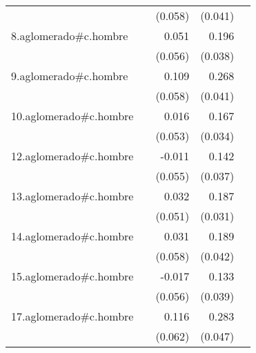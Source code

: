 {\begin{longtable}{l*{4}{D{.}{.}{-1}}}
            &                     &     (0.058)         &     (0.041)         &                     \\
\addlinespace
8.aglomerado#c.hombre&                     &       0.051         &       0.196\sym{***}&                     \\
            &                     &     (0.056)         &     (0.038)         &                     \\
\addlinespace
9.aglomerado#c.hombre&                     &       0.109         &       0.268\sym{***}&                     \\
            &                     &     (0.058)         &     (0.041)         &                     \\
\addlinespace
10.aglomerado#c.hombre&                     &       0.016         &       0.167\sym{***}&                     \\
            &                     &     (0.053)         &     (0.034)         &                     \\
\addlinespace
12.aglomerado#c.hombre&                     &      -0.011         &       0.142\sym{***}&                     \\
            &                     &     (0.055)         &     (0.037)         &                     \\
\addlinespace
13.aglomerado#c.hombre&                     &       0.032         &       0.187\sym{***}&                     \\
            &                     &     (0.051)         &     (0.031)         &                     \\
\addlinespace
14.aglomerado#c.hombre&                     &       0.031         &       0.189\sym{***}&                     \\
            &                     &     (0.058)         &     (0.042)         &                     \\
\addlinespace
15.aglomerado#c.hombre&                     &      -0.017         &       0.133\sym{***}&                     \\
            &                     &     (0.056)         &     (0.039)         &                     \\
\addlinespace
17.aglomerado#c.hombre&                     &       0.116         &       0.283\sym{***}&                     \\
            &                     &     (0.062)         &     (0.047)         &                     \\

\end{longtable}}
